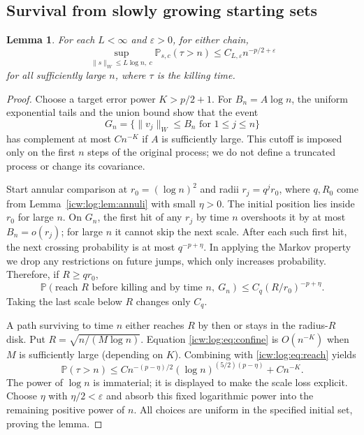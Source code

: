 \documentclass[11pt,letterpaper]{article}
\newtheorem{lemma}[theorem]{Lemma}
\theoremstyle{remark}\newtheorem{remark}[theorem]{Remark}
\newcommand{\eps}{\varepsilon}
\newcommand{\Prob}{\mathbb P}
\newcommand{\1}{\mathbf1}
\begin{document}
\subsection{Survival from slowly growing starting sets}
\begin{lemma}\label{icw:log:lem:survival}
For each $L<\infty$ and $\eps>0$, for either chain,
\begin{equation}\label{icw:log:eq:survival}
 \sup_{\|s\|_W\le L\log n,\ c}\Prob_{s,c}(\tau>n)
       \le C_{L,\eps}n^{-p/2+\eps}
\end{equation}
for all sufficiently large $n$, where $\tau$ is the killing time.
\end{lemma}
\begin{proof}
Choose a target error power $K>p/2+1$. For $B_n=A\log n$, the uniform
exponential tails and the union bound show that the event
\[
 G_n=\{\|v_j\|_W\le B_n\text{ for }1\le j\le n\}
\]
has complement at most $C n^{-K}$ if $A$ is sufficiently large. This
cutoff is imposed only on the first $n$ steps of the original process;
we do not define a truncated process or change its covariance.

Start annular comparison at $r_0=(\log n)^2$ and radii $r_j=q^jr_0$,
where $q,R_0$ come from Lemma~\ref{icw:log:lem:annuli} with small $\eta>0$.
The initial position lies inside $r_0$ for large $n$. On $G_n$, the
first hit of any $r_j$ by time $n$ overshoots it by at most $B_n=o(r_j)$;
for large $n$ it cannot skip the next scale. After each such first hit,
the next crossing probability is at most $q^{-p+\eta}$. In applying the
Markov property we drop any restrictions on future jumps, which only
increases probability. Therefore, if $R\ge qr_0$,
\begin{equation}\label{icw:log:eq:reach}
 \Prob(\text{reach }R\text{ before killing and by time }n,\ G_n)
 \le C_q(R/r_0)^{-p+\eta}.
\end{equation}
Taking the last scale below $R$ changes only $C_q$.

A path surviving to time $n$ either reaches $R$ by then or stays in the
radius-$R$ disk. Put $R=\sqrt{n/(M\log n)}$. Equation
\eqref{icw:log:eq:confine} is $O(n^{-K})$ when $M$ is sufficiently large
(depending on $K$). Combining with \eqref{icw:log:eq:reach} yields
\[
 \Prob(\tau>n)\le
 C n^{-(p-\eta)/2}(\log n)^{(5/2)(p-\eta)}+C n^{-K}.
\]
The power of $\log n$ is immaterial; it is displayed to make the scale
loss explicit. Choose $\eta$ with $\eta/2<\eps$ and absorb this fixed
logarithmic power into the remaining positive power of $n$. All choices
are uniform in the specified initial set, proving the lemma.
\end{proof}
\end{document}
